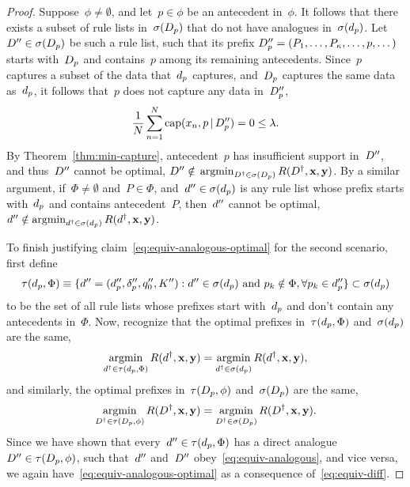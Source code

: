 \begin{arxiv}
\begin{proof}
Suppose~${\phi \neq \emptyset}$, and let~${p \in \phi}$
be an antecedent in~$\phi$.
%
It follows that there exists a subset of rule lists
in~$\sigma(D_p)$ that do not have analogues
in~$\sigma(d_p)$.
%
Let~${{D}'' \in \sigma(D_p)}$ be such a rule list,
such that its prefix ${D_p'' = (P_1, \dots, P_\kappa, \dots, p, \dots)}$
starts with~$D_p$ and contains~$p$ among its remaining antecedents.
%
Since~$p$ captures a subset of the data that~$d_p$ captures,
and~$D_p$ captures the same data as~$d_p$,
it follows that~$p$ does not capture any data in~$D_p''$, \ie
\begin{align}
\frac{1}{N} \sum_{n=1}^N \textnormal{cap}(x_n, p \,|\, D_p'') = 0 \le {\lambda}.
\end{align}
By Theorem~\ref{thm:min-capture}, antecedent~$p$ has insufficient
support in~${D}''$, and thus~${D}''$ cannot be optimal, \ie
${{D}'' \notin}$ ${\operatorname*{argmin}_{{D}^\dagger \in \sigma(D_p)} R({D}^\dagger, \mathbf{x}, \mathbf{y})}$.
%
By a similar argument, if~${\Phi \neq \emptyset}$
and~${P \in \Phi}$, and~${{d}'' \in \sigma(d_p)}$
is any rule list whose prefix starts with~$d_p$
and contains antecedent~$P$, then~${d}''$ cannot be optimal, \ie
${{d}'' \notin \operatorname*{argmin}_{{d}^\dagger \in \sigma(d_p)} R({d}^\dagger, \mathbf{x}, \mathbf{y})}$.

To finish justifying claim~\eqref{eq:equiv-analogous-optimal}
for the second scenario, first define
\begin{align}
\tau(d_p, \Phi) \equiv
  \{{d}'' = (d_p'', \delta_p'', q_0'', K'') :
    {d}'' \in \sigma(d_p) \textnormal{ and }
    p_k \notin \Phi, \forall p_k \in d_p''\} \subset \sigma(d_p)
\end{align}
to be the set of all rule lists whose prefixes start with~$d_p$
and don't contain any antecedents in~$\Phi$.
%
Now, recognize that the optimal prefixes in~$\tau(d_p, \Phi)$
and~$\sigma(d_p)$ are the same, \ie
\begin{align}
\operatorname*{argmin}_{{d}^\dagger \in \tau(d_p, \Phi)} R({d}^\dagger, \mathbf{x}, \mathbf{y})
= \operatorname*{argmin}_{{d}^\dagger \in \sigma(d_p)} R({d}^\dagger, \mathbf{x}, \mathbf{y}),
\end{align}
and similarly, the optimal prefixes in~$\tau(D_p, \phi)$
and~$\sigma(D_p)$ are the same, \ie
\begin{align}
\operatorname*{argmin}_{{D}^\dagger \in \tau(D_p, \phi)} R({D}^\dagger, \mathbf{x}, \mathbf{y})
= \operatorname*{argmin}_{{D}^\dagger \in \sigma(D_p)} R({D}^\dagger, \mathbf{x}, \mathbf{y}).
\end{align}
Since we have shown that every~${{d}'' \in \tau(d_p, \Phi)}$
has a direct analogue~${{D}'' \in \tau(D_p, \phi)}$,
such that~${d}''$ and~${D}''$ obey~\eqref{eq:equiv-analogous},
and vice versa, we again have~\eqref{eq:equiv-analogous-optimal}
as a consequence of~\eqref{eq:equiv-diff}.


\end{proof}
\end{arxiv}
